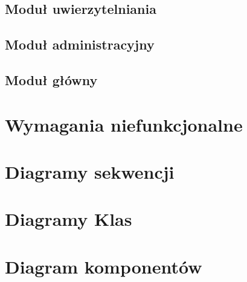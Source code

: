 \documentclass[12pt, oneside, final]{report}
\begin{document}
\section{Moduł uwierzytelniania}

\section{Moduł administracyjny}

\section{Moduł główny}


\chapter{Wymagania niefunkcjonalne}


\chapter{Diagramy sekwencji}


\chapter{Diagramy Klas}


\chapter{Diagram komponentów}

\end{document}

